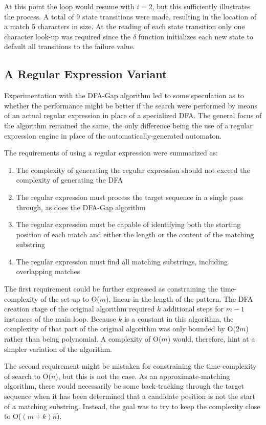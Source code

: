 At this point the loop would resume with $i=2$, but this sufficiently illustrates the process. A total of 9 state transitions were made, resulting in the location of a match 5 characters in size. At the reading of each state transition only one character look-up was required since the $\delta$ function initializes each new state to default all transitions to the failure value.

\subsection{A Regular Expression Variant}
\label{subsec:regexp_variant}

Experimentation with the DFA-Gap algorithm led to some speculation as to whether the performance might be better if the search were performed by means of an actual regular expression in place of a specialized DFA. The general focus of the algorithm remained the same, the only difference being the use of a regular expression engine in place of the automatically-generated automaton.

The requirements of using a regular expression were summarized as:

\begin{enumerate}
\item The complexity of generating the regular expression should not exceed the complexity of generating the DFA
\item The regular expression must process the target sequence in a single pass through, as does the DFA-Gap algorithm
\item The regular expression must be capable of identifying both the starting position of each match and either the length or the content of the matching substring
\item The regular expression must find all matching substrings, including overlapping matches
\end{enumerate}

The first requirement could be further expressed as constraining the time-complexity of the set-up to O($m$), linear in the length of the pattern. The DFA creation stage of the original algorithm required $k$ additional steps for $m-1$ instances of the main loop. Because $k$ is a constant in this algorithm, the complexity of that part of the original algorithm was only bounded by O($2m$) rather than being polynomial. A complexity of O($m$) would, therefore, hint at a simpler variation of the algorithm.

The second requirement might be mistaken for constraining the time-complexity of search to O($n$), but this is not the case. As an approximate-matching algorithm, there would necessarily be some back-tracking through the target sequence when it has been determined that a candidate position is not the start of a matching substring. Instead, the goal was to try to keep the complexity close to O($(m+k)n$).

